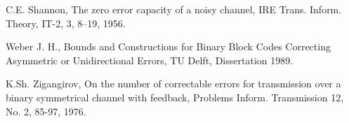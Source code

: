 \documentclass[conference]{IEEEtran}
\begin{document}
\begin{thebibliography}{xxx}
	 C.E. Shannon, 
	The zero error capacity of a noisy channel,
	IRE Trans. Inform. Theory, IT-2, 3, 8–19, 1956.

	 Weber J. H.,
	Bounds and Constructions for Binary Block Codes Correcting Asymmetric or Unidirectional Errors, 
	TU Delft, Dissertation 1989.
	
	 K.Sh. Zigangirov, 
	On the number of correctable errors for
	transmission over a binary symmetrical channel with feedback,
	Problems Inform. Transmission 12, No. 2, 85-97, 1976.
	
	
	
	
	
	
	
	
	
	
	
	

\end{thebibliography}
\end{document}
